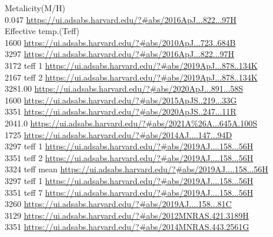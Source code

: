 Metalicity(M/H)\\
0.047 \url{https://ui.adsabs.harvard.edu/?#abs/2016ApJ...822...97H}\\

Effective temp.(Teff)\\
1600 \url{https://ui.adsabs.harvard.edu/?#abs/2010ApJ...723..684B}\\
3297 \url{https://ui.adsabs.harvard.edu/?#abs/2016ApJ...822...97H}\\
3172 teff 1 \url{https://ui.adsabs.harvard.edu/?#abs/2019ApJ...878..134K}\\
2167 teff 2 \url{https://ui.adsabs.harvard.edu/?#abs/2019ApJ...878..134K}\\
3281.00 \url{https://ui.adsabs.harvard.edu/?#abs/2020ApJ...891...58S}\\
1600 \url{https://ui.adsabs.harvard.edu/?#abs/2015ApJS..219...33G}\\
3351 \url{https://ui.adsabs.harvard.edu/?#abs/2020ApJS..247...11R}\\
2041.0 \url{https://ui.adsabs.harvard.edu/?#abs/2021A%26A...645A.100S}\\
1725 \url{https://ui.adsabs.harvard.edu/?#abs/2014AJ....147...94D}\\
3297 teff 1 \url{https://ui.adsabs.harvard.edu/?#abs/2019AJ....158...56H}\\
3351 teff 2 \url{https://ui.adsabs.harvard.edu/?#abs/2019AJ....158...56H}\\
3324 teff mean \url{https://ui.adsabs.harvard.edu/?#abs/2019AJ....158...56H}\\
3297 teff 1	 \url{https://ui.adsabs.harvard.edu/?#abs/2019AJ....158...56H}\\
3351 teff 7  \url{https://ui.adsabs.harvard.edu/?#abs/2019AJ....158...56H}\\
3260 \url{https://ui.adsabs.harvard.edu/?#abs/2019AJ....158...81C}\\
3129 \url{https://ui.adsabs.harvard.edu/?#abs/2012MNRAS.421.3189H}\\
3351 \url{https://ui.adsabs.harvard.edu/?#abs/2014MNRAS.443.2561G}\\

